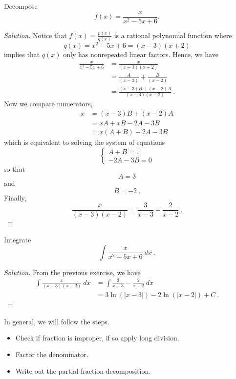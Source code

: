 \documentclass[compacto,10pt,comentarios]{aleph-notas}
\begin{document}
\begin{ejer}
    Decompose
    $$
        f(x) = \frac{x}{x^{2} - 5x + 6}.
    $$
\end{ejer}
\begin{proof}[Solution]
    Notice that $f(x) = \frac{p(x)}{q(x)}$ is a rational polynomial function where
    $$
        q(x) = x^{2} - 5x + 6 = (x-3)(x+2)
    $$
    implies that $q(x)$ only has nonrepeated linear factors. Hence, we have
    \begin{align*}
        \frac{x}{x^{2} - 5x + 6}
        & = \frac{x}{(x - 3)(x - 2)} \\ 
        & = \frac{A}{(x - 3)} + \frac{B}{(x - 2)} \\
        & = \frac{\left(x - 3\right) B + \left(x - 2\right) A}{\left(x - 3\right) \left(x - 2\right)} ~ .
    \end{align*}
    Now we compare numerators,
    \begin{align*}
        x & = \left(x - 3\right) B + \left(x - 2\right) A \\
        & = x A + x B - 2 A - 3 B \\
        & = x \left(A + B\right) - 2 A - 3 B ~
    \end{align*}
    which is equivalent to solving the system of equations
    $$
        \begin{cases} A + B = 1\\-2 A - 3 B = 0 \end{cases}
    $$
    so that
    $$
        A = 3
    $$
    and
    $$
        B = -2 ~ .
    $$
    Finally,
    $$
        \frac{x}{\left(x - 3\right) \left(x - 2\right)}=\frac{3}{x - 3} - \frac{2}{x - 2} ~ .
    $$
\end{proof}

\begin{ejer}
    Integrate
    $$
        \int \frac{x}{x^{2} - 5x + 6} ~ dx ~ .
    $$
\end{ejer}
\begin{proof}[Solution]
    From the previous exercise, we have
    \begin{align*}
      \int \frac{x}{\left(x - 3\right) \left(x - 2\right)} ~ dx 
      & = \int \frac{3}{x - 3} - \frac{2}{x - 2} ~ dx \\
      & = 3\ln(|x - 3|) - 2 \ln(|x - 2|) + C ~ .
    \end{align*}
\end{proof}

In general, we will follow the steps.
\begin{itemize}
    \item Check if fraction is improper, if so apply long division.
    \item Factor the denominator.
    \item Write out the partial fraction decomposition.
\end{itemize}
\end{document}
